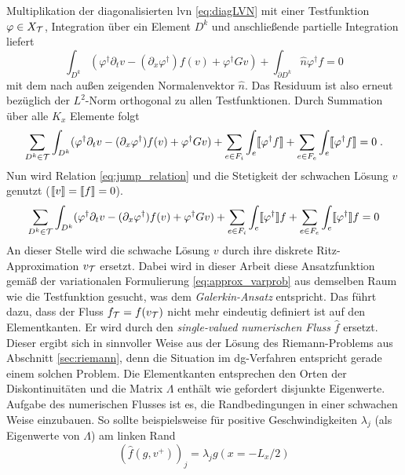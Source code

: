 Multiplikation der diagonalisierten \ac{lvn} \eqref{eq:diagLVN} mit einer Testfunktion $\varphi\in X_{\mathcal{T}}$, Integration über ein Element $D^k$ und anschließende partielle Integration liefert
\begin{equation*}
  \int_{D^k} (\varphi^{\dagger} \partial_t v - (\partial_x \varphi^{\dagger}) f(v) + \varphi^{\dagger} G v) + \int_{\partial D^k}\hat{n}\varphi^{\dagger}f = 0
\end{equation*}
mit dem nach außen zeigenden Normalenvektor $\hat{n}$. Das Residuum ist also erneut bezüglich der $L^2$-Norm orthogonal zu allen Testfunktionen. Durch Summation über alle $K_x$ Elemente folgt
\begin{equation*}
  \sum_{D^k\in\mathcal{T}}\int_{D^k} (\varphi^{\dagger} \partial_t v - (\partial_x \varphi^{\dagger}) f(v) + \varphi^{\dagger} G v)
  + \sum_{e\in F_i}\int_{e}\llbracket \varphi^{\dagger}f \rrbracket + \sum_{e\in F_e}\int_e \llbracket \varphi^{\dagger}f \rrbracket  = 0 \; .
\end{equation*}
Nun wird Relation \eqref{eq:jump_relation} und die Stetigkeit der schwachen Lösung $v$ genutzt (${\llbracket v \rrbracket=\llbracket f \rrbracket=0}$).
\begin{equation}
  \sum_{D^k\in\mathcal{T}}\int_{D^k} (\varphi^{\dagger} \partial_t v - (\partial_x \varphi^{\dagger}) f(v) + \varphi^{\dagger} G v)
  + \sum_{e\in F_i}\int_{e}\llbracket \varphi^{\dagger} \rrbracket f + \sum_{e\in F_e}\int_e \llbracket \varphi^{\dagger} \rrbracket f  = 0
  \label{eq:kontinForm}
\end{equation}
An dieser Stelle wird die schwache Lösung $v$ durch ihre diskrete Ritz-Approximation $v_{\mathcal{T}}$ ersetzt. Dabei wird in dieser Arbeit diese Ansatzfunktion gemäß der variationalen Formulierung \eqref{eq:approx_varprob} aus demselben Raum wie die Testfunktion gesucht, was dem \emph{Galerkin-Ansatz} entspricht. Das führt dazu, dass der Fluss $f_{\mathcal{T}} = f(v_{\mathcal{T}})$ nicht mehr eindeutig definiert ist auf den Elementkanten. Er wird durch den \emph{single-valued} \emph{numerischen Fluss} $\hat{f}$ ersetzt. Dieser ergibt sich in sinnvoller Weise aus der Lösung des Riemann-Problems aus Abschnitt \ref{sec:riemann}, denn die Situation im \ac{dg}-Verfahren entspricht gerade einem solchen Problem. Die Elementkanten entsprechen den Orten der Diskontinuitäten und die Matrix $\Lambda$ enthält wie gefordert disjunkte Eigenwerte.
Aufgabe des numerischen Flusses ist es, die Randbedingungen in einer schwachen Weise einzubauen. So sollte beispielsweise für positive Geschwindigkeiten $\lambda_j$ (als Eigenwerte von $\Lambda$) am linken Rand
\begin{equation*}
  (\hat{f}(g, v^+))_j = \lambda_j g(x=-L_x/2)
\end{equation*}

